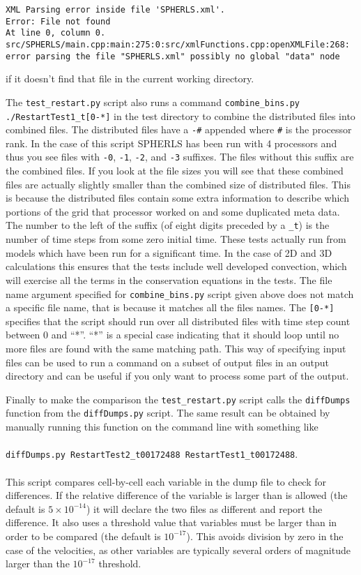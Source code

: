 \documentclass[12pt,a4paper]{book}
\begin{document}
{\tiny
\begin{verbatim}
XML Parsing error inside file 'SPHERLS.xml'.
Error: File not found
At line 0, column 0.
src/SPHERLS/main.cpp:main:275:0:src/xmlFunctions.cpp:openXMLFile:268: error parsing the file "SPHERLS.xml" possibly no global "data" node
\end{verbatim}
}
\noindent if it doesn't find that file in the current working directory.

The {\tt test\_restart.py} script also runs a command {\tt combine\_bins.py ./RestartTest1\_t[0-*]} in the test directory to combine the distributed files into combined files. The distributed files have a {\tt -\#} appended where {\tt \#} is the processor rank. In the case of this script SPHERLS has been run with 4 processors and thus you see files with {\tt -0}, {\tt -1}, {\tt -2}, and {\tt -3} suffixes. The files without this suffix are the combined files. If you look at the file sizes you will see that these combined files are actually slightly smaller than the combined size of distributed files. This is because the distributed files contain some extra information to describe which portions of the grid that processor worked on and some duplicated meta data. The number to the left of the suffix (of eight digits preceded by a {\tt \_t}) is the number of time steps from some zero initial time. These tests actually run from models which have been run for a significant time. In the case of 2D and 3D calculations this ensures that the tests include well developed convection, which will exercise all the terms in the conservation equations in the tests. The file name argument specified for {\tt combine\_bins.py} script given above does not match a specific file name, that is because it matches all the files names. The {\tt [0-*]} specifies that the script should run over all distributed files with time step count between 0 and ``*''. ``*'' is a special case indicating that it should loop until no more files are found with the same matching path. This way of specifying input files can be used to run a command on a subset of output files in an output directory and can be useful if you only want to process some part of the output.

Finally to make the comparison the {\tt test\_restart.py} script calls the {\tt diffDumps} function from the {\tt diffDumps.py} script. The same result can be obtained by manually running this function on the command line with something like\\
 \\
{\tt diffDumps.py RestartTest2\_t00172488 RestartTest1\_t00172488}.\\
 \\
This script compares cell-by-cell each variable in the dump file to check for differences. If the relative difference of the variable is larger than is allowed (the default is $5\times10^{-14}$) it will declare the two files as different and report the difference. It also uses a threshold value that variables must be larger than in order to be compared (the default is $10^{-17}$). This avoids division by zero in the case of the velocities, as other variables are typically several orders of magnitude larger than the $10^{-17}$ threshold.
\end{document}
